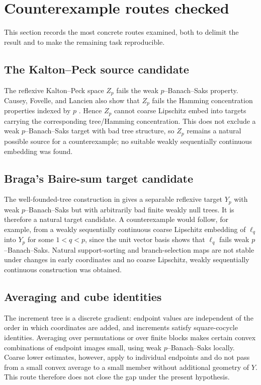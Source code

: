 \documentclass[11pt]{amsart}
\theoremstyle{definition}
\theoremstyle{remark}
\begin{document}
\section{Counterexample routes checked}

This section records the most concrete routes examined, both to delimit the result and to make the remaining task reproducible.

\subsection*{The Kalton--Peck source candidate}
The reflexive Kalton--Peck space $Z_p$ fails the weak $p$--Banach--Saks property.  Causey, Fovelle, and Lancien also show that $Z_p$ fails the Hamming concentration properties indexed by $p$ \cite[Propositions~5.6--5.7]{CauseyFovelleLancien}.  Hence $Z_p$ cannot coarse Lipschitz embed into targets carrying the corresponding tree/Hamming concentration.  This does not exclude a weak $p$--Banach--Saks target with bad tree structure, so $Z_p$ remains a natural possible source for a counterexample; no suitable weakly sequentially continuous embedding was found.

\subsection*{Braga's Baire-sum target candidate}
The well-founded-tree construction in \cite[Theorem~7.1]{BragaJIMJ} gives a separable reflexive target $Y_p$ with weak $p$--Banach--Saks but with arbitrarily bad finite weakly null trees.  It is therefore a natural target candidate.  A counterexample would follow, for example, from a weakly sequentially continuous coarse Lipschitz embedding of $\ell_q$ into $Y_p$ for some $1<q<p$, since the unit vector basis shows that $\ell_q$ fails weak $p$--Banach--Saks.  Natural support-sorting and branch-selection maps are not stable under changes in early coordinates and no coarse Lipschitz, weakly sequentially continuous construction was obtained.

\subsection*{Averaging and cube identities}
The increment tree is a discrete gradient: endpoint values are independent of the order in which coordinates are added, and increments satisfy square-cocycle identities.  Averaging over permutations or over finite blocks makes certain convex combinations of endpoint images small, using weak $p$--Banach--Saks locally.  Coarse lower estimates, however, apply to individual endpoints and do not pass from a small convex average to a small member without additional geometry of $Y$.  This route therefore does not close the gap under the present hypothesis.
\end{document}
